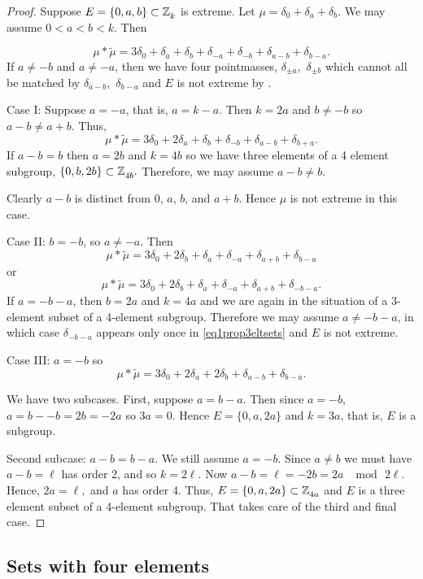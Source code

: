 \begin{proof} Suppose $E=\{0, a,b\}\subset \texttt{$\mathbb Z_{k}^{\,}$}$ is extreme. Let $\mu = \delta_0 +\delta_a+\delta_b.$
We may assume $0<a<b<k$. Then 

\begin{equation}\label{eq1prop3eltsets}
\mu*\tilde\mu= 3\delta_0+\delta_a+\delta_b +\delta_{-a}+\delta_{-b}+\delta_{a-b}+
\delta_{b-a}.
\end{equation}
 If $a\ne -b$ and $a\ne -a$,  then we have four pointmasses, $\delta_{\pm a},$ $ \delta_{\pm b}$ which cannot all
be matched by $\delta_{a-b},$ $\delta_{b-a}$ and $E$ is not extreme by \cite[Cor. 2.3]{ABeastiary}. 

\smallbreak
Case I: Suppose $a=-a$, that is, $a=k-a.$ Then $k=2a$ and $b\ne -b$ so $a-b\ne a+b$.
Thus,\[
\mu*\tilde\mu= 3\delta_0+2\delta_a+\delta_b +\delta_{-b}+\delta_{a-b}+
\delta_{b+a}.
\]
If $a-b=b$ then $a=2b$ and $k=4b$ so we have three elements of a  4 element subgroup, $\{0, b, 2b\}\subset\texttt{$\mathbb Z_{4b}^{\,}$}.$
Therefore, we may assume $a-b\ne b$. 

Clearly $a-b$ is distinct from $0$, $a$, $b$, and $a+b$. Hence $\mu$ is not extreme in this case.

\smallbreak
Case II: $b=-b$, so $a\ne-a$. Then 
\[
\mu*\tilde\mu= 3\delta_0+2\delta_b +\delta_a+\delta_{-a}+\delta_{a+b}+
\delta_{b-a}
\]
or
\[
\mu*\tilde\mu= 3\delta_0+2\delta_b +\delta_a+\delta_{-a}+\delta_{a+b}+
\delta_{-b-a}.
\]
If $a=-b-a$, then $b=2a$ and $k=4a$ and we are again in the situation of a 3-element subset of a 4-element subgroup.
Therefore we may assume $a\ne -b-a$, in which case $\delta_{-b-a}$ appears only once in \eqref{eq1prop3eltsets} and $E$ is not extreme.
\smallbreak

Case III: 
$a=-b$ so 
\[ 
\mu*\tilde \mu = 3\delta_0+2\delta_a+2\delta_b + \delta_{a-b}+\delta_{b-a}.
\] 

We have two subcases. First, suppose $a= b-a$. Then since $a=-b$, $a= b--b=2b=-2a$ so $3a=0$. Hence $E=\{0,a,2a\}$ and $k=3a$, that is, $E$ is a subgroup.

Second subcase: $a-b=b-a$. We still assume $a=-b$.
  Since $a\ne b$ we must have $a-b=\ell$ has order 2, and so $k=2\ell.$ Now $a-b = \ell = -2b = 2a$ $\mod\,2\ell$. Hence, $2a=\ell,$
 and $a$ has order 4. Thus, $E=\{0,a, 2a\}\subset\texttt{$\mathbb Z_{4a}^{\,}$}$ and $E$ is a three element subset of a 4-element subgroup. That takes care
 of the third and final case.
\end{proof}


\subsection{Sets with four elements} 

